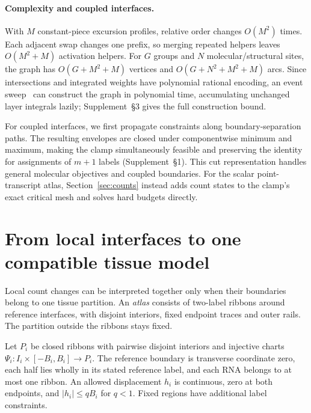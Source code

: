 \documentclass[10pt,letterpaper]{article}
\begin{document}
\paragraph{Complexity and coupled interfaces.}
With $M$ constant-piece excursion profiles, relative order changes $O(M^2)$ times. Each adjacent swap changes one prefix, so merging repeated helpers leaves $O(M^2+M)$ activation helpers. For $G$ groups and $N$ molecular/structural sites, the graph has $O(G+M^2+M)$ vertices and $O(G+N^2+M^2+M)$ arcs. Since intersections and integrated weights have polynomial rational encoding, an event sweep~\cite{bentley} can construct the graph in polynomial time, accumulating unchanged layer integrals lazily; Supplement~\S3 gives the full construction bound.

For coupled interfaces, we first propagate constraints along boundary-separation paths. The resulting envelopes are closed under componentwise minimum and maximum, making the clamp simultaneously feasible and preserving the identity for assignments of $m+1$ labels (Supplement~\S1). This cut representation handles general molecular objectives and coupled boundaries. For the scalar point-transcript atlas, Section~\ref{sec:counts} instead adds count states to the clamp's exact critical mesh and solves hard budgets directly.

\section{From local interfaces to one compatible tissue model}\label{sec:atlas}
Local count changes can be interpreted together only when their boundaries belong to one tissue partition. An \emph{atlas} consists of two-label ribbons around reference interfaces, with disjoint interiors, fixed endpoint traces and outer rails. The partition outside the ribbons stays fixed.

Let $P_i$ be closed ribbons with pairwise disjoint interiors and injective charts $\Psi_i:I_i\times[-B_i,B_i]\to P_i$. The reference boundary is transverse coordinate zero, each half lies wholly in its stated reference label, and each RNA belongs to at most one ribbon. An allowed displacement $h_i$ is continuous, zero at both endpoints, and $|h_i|\le qB_i$ for $q<1$. Fixed regions have additional label constraints.
\end{document}
